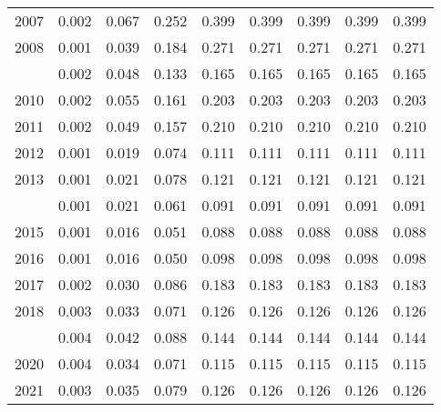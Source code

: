 \documentclass[
]{article}
\begin{document}
\begin{longtable}[t]{lrrrrrrrr}
2007 & 0.002 & 0.067 & 0.252 & 0.399 & 0.399 & 0.399 & 0.399 & 0.399\\
2008 & 0.001 & 0.039 & 0.184 & 0.271 & 0.271 & 0.271 & 0.271 & 0.271\\
\addlinespace
2009 & 0.002 & 0.048 & 0.133 & 0.165 & 0.165 & 0.165 & 0.165 & 0.165\\
2010 & 0.002 & 0.055 & 0.161 & 0.203 & 0.203 & 0.203 & 0.203 & 0.203\\
2011 & 0.002 & 0.049 & 0.157 & 0.210 & 0.210 & 0.210 & 0.210 & 0.210\\
2012 & 0.001 & 0.019 & 0.074 & 0.111 & 0.111 & 0.111 & 0.111 & 0.111\\
2013 & 0.001 & 0.021 & 0.078 & 0.121 & 0.121 & 0.121 & 0.121 & 0.121\\
\addlinespace
2014 & 0.001 & 0.021 & 0.061 & 0.091 & 0.091 & 0.091 & 0.091 & 0.091\\
2015 & 0.001 & 0.016 & 0.051 & 0.088 & 0.088 & 0.088 & 0.088 & 0.088\\
2016 & 0.001 & 0.016 & 0.050 & 0.098 & 0.098 & 0.098 & 0.098 & 0.098\\
2017 & 0.002 & 0.030 & 0.086 & 0.183 & 0.183 & 0.183 & 0.183 & 0.183\\
2018 & 0.003 & 0.033 & 0.071 & 0.126 & 0.126 & 0.126 & 0.126 & 0.126\\
\addlinespace
2019 & 0.004 & 0.042 & 0.088 & 0.144 & 0.144 & 0.144 & 0.144 & 0.144\\
2020 & 0.004 & 0.034 & 0.071 & 0.115 & 0.115 & 0.115 & 0.115 & 0.115\\
2021 & 0.003 & 0.035 & 0.079 & 0.126 & 0.126 & 0.126 & 0.126 & 0.126\\*
\end{longtable}
\end{document}
